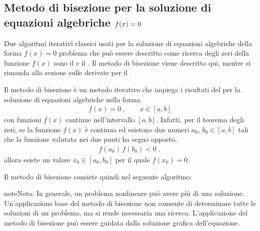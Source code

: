 \documentclass[letterpaper,10pt,italian]{jupyterBook}
\begin{document}
\subsection{Metodo di bisezione per la soluzione di equazioni algebriche \protect\(f(x) = 0\protect\)}
\label{\detokenize{ch/infinitesimal_calculus/analysis:metodo-di-bisezione-per-la-soluzione-di-equazioni-algebriche-f-x-0}}\label{\detokenize{ch/infinitesimal_calculus/analysis:infinitesimal-calculus-analysis-bisec}}
\sphinxAtStartPar
Due algoritmi iterativi classici usati per la soluzione di equazioni algebriche della forma \(f(x) = 0\) \sphinxhyphen{} problema che può essere descritto come ricerca degli zeri della funzione \(f(x)\) \sphinxhyphen{} sono il  e il . Il metodo di bisezione viene descritto qui, mentre si rimanda alla sezione sulle derivate per il {\hyperref[\detokenize{ch/infinitesimal_calculus/derivatives:infinitesimal-calculus-derivatives-applications-newton}]{}}.

\sphinxAtStartPar
Il metodo di bisezione è un metodo iterativo che impiega i risultati del {\hyperref[\detokenize{ch/infinitesimal_calculus/analysis:infinitesimal-calculus-continuous-fun-thms-zeros}]{}} per la soluzione di equazioni algebriche nella forma
\begin{equation*}
\begin{split}f(x) = 0 \ , \qquad x \in [a,b]\end{split}
\end{equation*}
\sphinxAtStartPar
con funzioni \(f(x)\) continue nell’intervallo \([a,b]\). Infatti, per il teorema degli zeri, se la funzione \(f(x)\) è continua ed esistono due numeri \(a_0, \, b_0 \in [a,b]\) tali che la funzione valutata nei due punti ha segno opposto,
\begin{equation*}
\begin{split}f(a_0) \, f(b_0) < 0 \ ,\end{split}
\end{equation*}
\sphinxAtStartPar
allora esiste un valore \(x_0 \in [a_0, b_0]\) per il quale \(f(x_0) = 0\).

\sphinxAtStartPar
Il metodo di bisezione consiste quindi nel seguente algoritmo: 

\begin{sphinxadmonition}{note}{Nota:}
\sphinxAtStartPar
In generale, un problema non\sphinxhyphen{}lineare può avere più di una soluzione. Un’applicazione base del metodo di bisezione non consente di determinare tutte le soluzioni di un problema, ma si rende necessaria una ricerca. L’applicazione del metodo di bisezione può essere guidata dalla soluzione grafica dell’equazione.
\end{sphinxadmonition}
\end{document}
